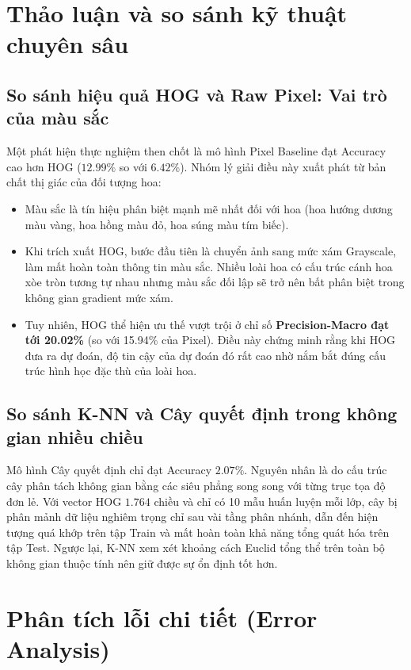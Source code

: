 \documentclass[../DoAn.tex]{subfiles}
\begin{document}
\section{Thảo luận và so sánh kỹ thuật chuyên sâu}
\subsection{So sánh hiệu quả HOG và Raw Pixel: Vai trò của màu sắc}
Một phát hiện thực nghiệm then chốt là mô hình Pixel Baseline đạt Accuracy cao hơn HOG ($12.99\%$ so với $6.42\%$). Nhóm lý giải điều này xuất phát từ bản chất thị giác của đối tượng hoa:
\begin{itemize}
    \item Màu sắc là tín hiệu phân biệt mạnh mẽ nhất đối với hoa (hoa hướng dương màu vàng, hoa hồng màu đỏ, hoa súng màu tím biếc).
    \item Khi trích xuất HOG, bước đầu tiên là chuyển ảnh sang mức xám Grayscale, làm mất hoàn toàn thông tin màu sắc. Nhiều loài hoa có cấu trúc cánh hoa xòe tròn tương tự nhau nhưng màu sắc đối lập sẽ trở nên bất phân biệt trong không gian gradient mức xám.
    \item Tuy nhiên, HOG thể hiện ưu thế vượt trội ở chỉ số \textbf{Precision-Macro đạt tới 20.02\%} (so với 15.94\% của Pixel). Điều này chứng minh rằng khi HOG đưa ra dự đoán, độ tin cậy của dự đoán đó rất cao nhờ nắm bắt đúng cấu trúc hình học đặc thù của loài hoa.
\end{itemize}

\subsection{So sánh K-NN và Cây quyết định trong không gian nhiều chiều}
Mô hình Cây quyết định chỉ đạt Accuracy $2.07\%$. Nguyên nhân là do cấu trúc cây phân tách không gian bằng các siêu phẳng song song với từng trục tọa độ đơn lẻ. Với vector HOG $1.764$ chiều và chỉ có 10 mẫu huấn luyện mỗi lớp, cây bị phân mảnh dữ liệu nghiêm trọng chỉ sau vài tầng phân nhánh, dẫn đến hiện tượng quá khớp trên tập Train và mất hoàn toàn khả năng tổng quát hóa trên tập Test. Ngược lại, K-NN xem xét khoảng cách Euclid tổng thể trên toàn bộ không gian thuộc tính nên giữ được sự ổn định tốt hơn.

\section{Phân tích lỗi chi tiết (Error Analysis)}
\end{document}
